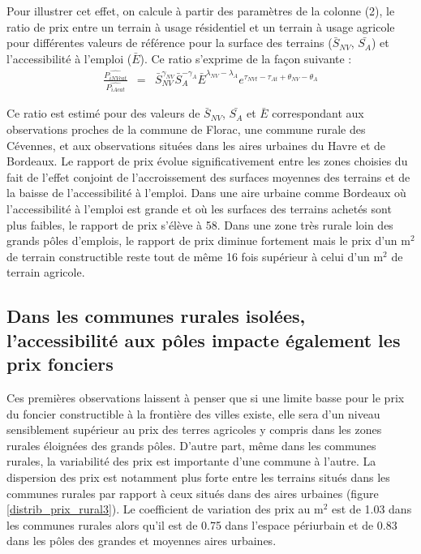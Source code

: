 \documentclass[10.5pt,a4paper]{article}
\begin{document}
{Pour illustrer cet effet, on calcule à partir des paramètres de la colonne (2), le ratio de prix entre un terrain à usage résidentiel et un terrain à usage agricole pour différentes valeurs de référence pour la surface des terrains ($\bar{S}_{NV}$, $\bar{S_A}$) et l'accessibilité à l'emploi ($\bar{E}$). Ce ratio s'exprime de la façon suivante :
\begin{eqnarray*}
\frac{\hat{P_{iNVcat}}}{\hat{P_{iAcat}}} & = &  \bar{S}_{NV}^{\gamma_{NV}} \bar{S}_{A}^{-\gamma_A} \bar{E}^{\lambda_{NV} - \lambda_A} e^{\tau_{NVt} - \tau_{At} + \theta_{NV} - \theta_{A}}
\end{eqnarray*}

Ce ratio est estimé pour des valeurs de $\bar{S}_{NV}$, $\bar{S_A}$ et $\bar{E}$ correspondant aux observations proches de la commune de Florac, une commune rurale des Cévennes, et aux observations situées dans les aires urbaines du Havre et de Bordeaux. Le rapport de prix évolue significativement entre les zones choisies du fait de l'effet conjoint de l'accroissement des surfaces moyennes des terrains et de la baisse de l'accessibilité à l'emploi. Dans une aire urbaine comme Bordeaux où l'accessibilité à l'emploi est grande et où les surfaces des terrains achetés sont plus faibles, le rapport de prix s'élève à 58. Dans une zone très rurale loin des grands pôles d'emplois, le rapport de prix diminue fortement mais le prix d'un m$^2$ de terrain constructible reste tout de même 16 fois supérieur à celui d'un m$^2$ de terrain agricole. \par 



\subsection{Dans les communes rurales isolées, l'accessibilité aux pôles impacte également les prix fonciers} 

Ces premières observations laissent à penser que si une limite basse pour le prix du foncier constructible à la frontière des villes existe, elle sera d'un niveau sensiblement supérieur au prix des terres agricoles y compris dans les zones rurales éloignées des grands pôles. D'autre part, même dans les communes rurales, la variabilité des prix est importante d'une commune à l'autre. La dispersion des prix est notamment plus forte entre les terrains situés dans les communes rurales par rapport à ceux situés dans des aires urbaines (figure \ref{distrib_prix_rural3}). Le coefficient de variation des prix au m$^2$ est de 1.03 dans les communes rurales alors qu'il est de 0.75 dans l'espace périurbain et de 0.83 dans les pôles des grandes et moyennes aires urbaines.\par

}
\end{document}
